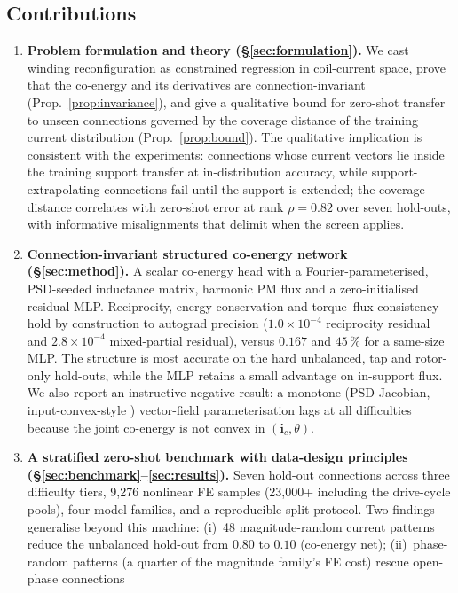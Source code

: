 \documentclass[review]{elsarticle}
\newcommand{\ic}{\boldsymbol{i}_c}
\begin{document}
\subsection{Contributions}

\begin{enumerate}
\item \textbf{Problem formulation and theory
(\S\ref{sec:formulation}).} We cast winding reconfiguration as constrained
regression in coil-current space, prove that the co-energy and its derivatives
are connection-invariant (Prop.~\ref{prop:invariance}), and give a
qualitative bound for zero-shot transfer to unseen connections governed by the
coverage distance of the training current distribution
(Prop.~\ref{prop:bound}). The qualitative implication is consistent with
the experiments: connections whose current vectors lie inside the training support
transfer at in-distribution accuracy, while support-extrapolating connections
fail until the support is extended; the coverage distance correlates with
zero-shot error at rank $\rho=0.82$ over seven hold-outs, with
informative misalignments that delimit when the screen applies.
\item \textbf{Connection-invariant structured co-energy network
(\S\ref{sec:method}).} A scalar co-energy head with a
Fourier-parameterised, PSD-seeded inductance matrix, harmonic PM flux and a
zero-initialised residual MLP. Reciprocity, energy conservation and
torque--flux consistency hold by construction to autograd precision
($1.0\times10^{-4}$ reciprocity residual and $2.8\times10^{-4}$
mixed-partial residual), versus $0.167$ and $45\,\%$ for a same-size MLP. The structure
is most accurate on the hard unbalanced, tap and rotor-only hold-outs,
while the MLP retains a small advantage on in-support flux. We also
report an instructive negative result: a monotone (PSD-Jacobian,
input-convex-style \cite{Amos2017ICNN}) vector-field
parameterisation lags at all difficulties because the joint co-energy is
not convex in $(\ic,\theta)$.
\item \textbf{A stratified zero-shot benchmark with data-design principles
(\S\ref{sec:benchmark}--\ref{sec:results}).} Seven hold-out connections
across three difficulty tiers, 9{,}276 nonlinear FE samples (23{,}000+
including the drive-cycle pools), four model
families, and a reproducible split protocol. Two findings generalise beyond
this machine: (i)~48 magnitude-random current patterns reduce the unbalanced
hold-out from $0.80$ to $0.10$ (co-energy net); (ii)~phase-random patterns
(a quarter of the magnitude family's FE cost) rescue open-phase connections

\end{enumerate}
\end{document}
